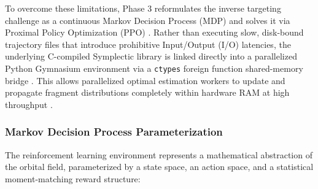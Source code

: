 \documentclass[letterpaper,11pt]{AAS}
\begin{document}
To overcome these limitations, Phase 3 reformulates the inverse targeting challenge as a continuous Markov Decision Process (MDP) and solves it via Proximal Policy Optimization (PPO) \cite{Abstract_AIAA_ASC_2026.pdf}. Rather than executing slow, disk-bound trajectory files that introduce prohibitive Input/Output (I/O) latencies, the underlying C-compiled Symplectic library is linked directly into a parallelized Python Gymnasium environment via a \texttt{ctypes} foreign function shared-memory bridge \cite{Abstract_AIAA_ASC_2026.pdf}. This allows parallelized optimal estimation workers to update and propagate fragment distributions completely within hardware RAM at high throughput \cite{Abstract_AIAA_ASC_2026.pdf}.

\subsubsection{Markov Decision Process Parameterization}
The reinforcement learning environment represents a mathematical abstraction of the orbital field, parameterized by a state space, an action space, and a statistical moment-matching reward structure:
\end{document}
